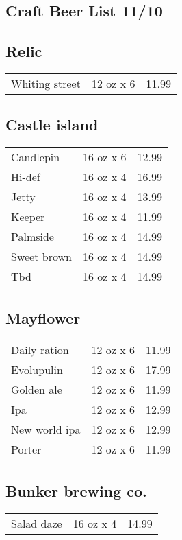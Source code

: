 \documentclass{article}%
\begin{document}
%
\pagestyle{empty}%
\normalsize%
%
\setlength{\columnseprule}{0.5pt}%
\setlength{\columnsep}{1cm}%
\renewcommand{\familydefault}{\sfdefault}%
\sffamily%
\begin{multicols}{3}%
\section*{\selectfont Craft Beer List 11/10}%

%
\subsection*{Relic}%
\begin{tabular}{l c r}%
Whiting street&12 oz x 6&11.99\\%
\end{tabular}

%
\subsection*{Castle island}%
\begin{tabular}{l c r}%
Candlepin&16 oz x 6&12.99\\%
Hi{-}def&16 oz x 4&16.99\\%
Jetty&16 oz x 4&13.99\\%
Keeper&16 oz x 4&11.99\\%
Palmside&16 oz x 4&14.99\\%
Sweet brown&16 oz x 4&14.99\\%
Tbd&16 oz x 4&14.99\\%
\end{tabular}

%
\subsection*{Mayflower}%
\begin{tabular}{l c r}%
Daily ration&12 oz x 6&11.99\\%
Evolupulin&12 oz x 6&17.99\\%
Golden ale&12 oz x 6&11.99\\%
Ipa&12 oz x 6&12.99\\%
New world ipa&12 oz x 6&12.99\\%
Porter&12 oz x 6&11.99\\%
\end{tabular}

%
\subsection*{Bunker brewing co.}%
\begin{tabular}{l c r}%
Salad daze&16 oz x 4&14.99\\%
\end{tabular}


\end{multicols}
\end{document}
